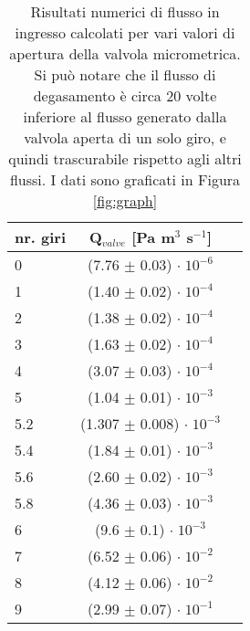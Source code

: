 \begin{SCtable}[0.6][b!]
	\begin{tabular}{ l c c }
        \toprule
        nr. giri & Q$_{valve}$ [Pa m$^3$ s$^{-1}$] \\ 
        \midrule
        0   & (7.76 $\pm$ 0.03) $ \cdot \; 10^{-6}$  \\
        1   & (1.40 $\pm$ 0.02) $ \cdot \; 10^{-4}$  \\
        2   & (1.38 $\pm$ 0.02) $ \cdot \; 10^{-4}$  \\
        3   & (1.63 $\pm$ 0.02) $ \cdot \; 10^{-4}$  \\
        4   & (3.07 $\pm$ 0.03) $ \cdot \; 10^{-4}$  \\
        5   & (1.04 $\pm$ 0.01) $ \cdot \; 10^{-3}$  \\
        5.2 & (1.307 $\pm$ 0.008) $ \cdot \; 10^{-3}$ \\
        5.4 & (1.84 $\pm$ 0.01) $ \cdot \; 10^{-3}$  \\
        5.6 & (2.60 $\pm$ 0.02) $ \cdot \; 10^{-3}$  \\
        5.8 & (4.36 $\pm$ 0.03) $ \cdot \; 10^{-3}$  \\
        6   &  (9.6 $\pm$ 0.1)  $ \cdot \; 10^{-3}$ \\
        7   & (6.52 $\pm$ 0.06) $ \cdot \; 10^{-2}$  \\
        8   & (4.12 $\pm$ 0.06) $ \cdot \; 10^{-2}$  \\
        9   & (2.99 $\pm$ 0.07) $ \cdot \; 10^{-1}$  \\
    \bottomrule

	\end{tabular}
	\caption{Risultati numerici di flusso in ingresso calcolati per vari valori di apertura della valvola micrometrica. Si può notare che il flusso di degasamento è circa 20 volte inferiore
    al flusso generato dalla valvola aperta di un solo giro, e quindi trascurabile rispetto agli altri flussi. I dati sono graficati in Figura \ref{fig:graph}}
    \label{tab:table}
\end{SCtable}
